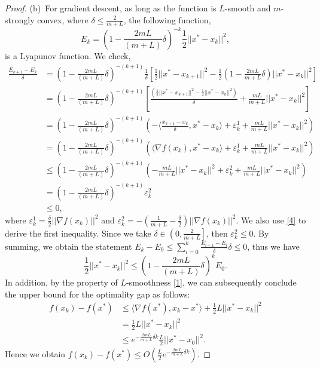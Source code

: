 \documentclass[11pt]{article}
\begin{document}
\begin{proof}
\noindent (b)\ For gradient descent, as long as the function is $L$-smooth and $m$-strongly convex, where $\delta\leq\frac{2}{m+L}$, the following function, 
\[
E_k = \left(1-\frac{2mL}{(m+L)}\delta\right)^{-k}\frac{1}{2}||x^*-x_k||^2,
\]
is a Lyapunov function. We check,
\begin{equation*}
    \begin{aligned}
        \frac{E_{k+1}-E_k}{\delta}
        & = \left(1-\frac{2mL}{(m+L)}\delta\right)^{-(k+1)}\frac{1}{\delta}\left[\frac{1}{2}||x^*-x_{k+1}||^2-\frac{1}{2}\left(1-\frac{2mL}{m+L}\delta\right)||x^*-x_k||^2\right] \\
        & = \left(1-\frac{2mL}{(m+L)}\delta\right)^{-(k+1)}\left[\frac{\left(\frac{1}{2}||x^*-x_{k+1}||^2-\frac{1}{2}||x^*-x_{k}||^2\right)}{\delta}+\frac{mL}{m+L}||x^*-x_k||^2\right] \\
        & = \left(1-\frac{2mL}{(m+L)}\delta\right)^{-(k+1)}\left(-\langle\frac{x_{k+1}-x_k}{\delta},x^*-x_k\rangle+\varepsilon_k^1+\frac{mL}{m+L}||x^*-x_k||^2\right) \\
        & = \left(1-\frac{2mL}{(m+L)}\delta\right)^{-(k+1)}\left(\langle\nabla f(x_k),x^*-x_k\rangle+\varepsilon_k^1+\frac{mL}{m+L}||x^*-x_k||^2\right) \\
        & \leq \left(1-\frac{2mL}{(m+L)}\delta\right)^{-(k+1)}\left(-\frac{mL}{m+L}||x^*-x_k||^2+\varepsilon_k^2+\frac{mL}{m+L}||x^*-x_k||^2\right) \\
        & = \left(1-\frac{2mL}{(m+L)}\delta\right)^{-(k+1)}\varepsilon_k^2 \\
        & \leq 0,
    \end{aligned}
\end{equation*}
where $\varepsilon_k^1=\frac{\delta}{2}||\nabla f(x_k)||^2$ and $\varepsilon_k^2=-\left(\frac{1}{m+L}-\frac{\delta}{2}\right)||\nabla f(x_k)||^2$. We also use \eqref{4} to derive the first inequality. Since we take $\delta\in\left(0,\frac{2}{m+L}\right]$, then $\varepsilon_k^2\leq0$. By summing, we obtain the statement $E_k-E_0\leq\sum_{i=0}^{k}\frac{E_{i+1}-E_i}{\delta}\delta\leq0$, thus we have
\[
\frac{1}{2}||x^*-x_k||^2 \leq \left(1-\frac{2mL}{(m+L)}\delta\right)^{k}E_0.
\]
In addition, by the property of $L$-smoothness \eqref{1}, we can subsequently conclude the upper bound for the optimality gap as follows:
\begin{equation*}
    \begin{aligned}
        f(x_k)-f(x^*) & \leq \langle\nabla f(x^*),x_k-x^*\rangle+\frac{1}{2}L||x^*-x_k||^2 \\
                      & = \frac{1}{2}L||x^*-x_k||^2 \\
                      & \leq e^{-\frac{2mL}{m+L}\delta k}\frac{L}{2}||x^*-x_0||^2.
    \end{aligned}
\end{equation*}
Hence we obtain $f(x_k)-f(x^*)\leq O(\frac{L}{2}e^{-\frac{2mL}{m+L}\delta k})$. 
\end{proof}
\end{document}
